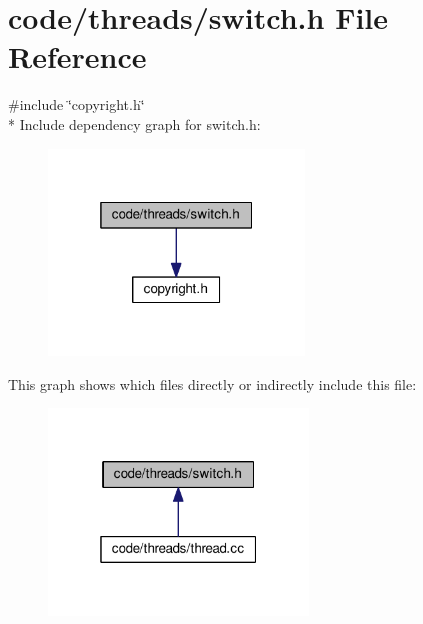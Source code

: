 \section{code/threads/switch.h File Reference}
\label{switch_8h}
{\ttfamily \#include \char`\"{}copyright.\+h\char`\"{}}\\*
Include dependency graph for switch.\+h\+:
\nopagebreak
\begin{figure}[H]
\begin{center}
\leavevmode
\includegraphics[width=193pt]{switch_8h__incl}
\end{center}
\end{figure}
This graph shows which files directly or indirectly include this file\+:
\nopagebreak
\begin{figure}[H]
\begin{center}
\leavevmode
\includegraphics[width=196pt]{switch_8h__dep__incl}
\end{center}
\end{figure}
